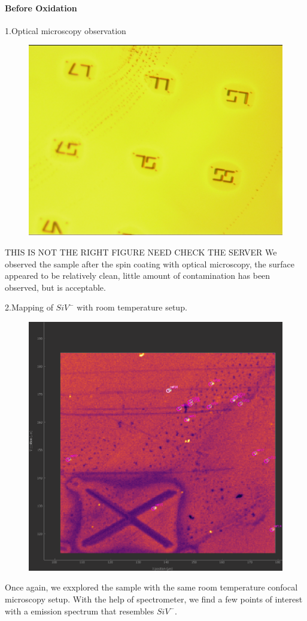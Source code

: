 \paragraph{Before Oxidation}
1.Optical microscopy observation
\FloatBarrier
\begin{figure}[h]
\centering
\includegraphics[width=0.7\linewidth]{Figures/pic/20150907_sample214_spincoated_5}
\caption{}
\label{fig:20150907sample214spincoated5}
\end{figure}
\FloatBarrier  
THIS IS NOT THE RIGHT FIGURE NEED CHECK THE SERVER
We observed the sample after the spin coating with optical microscopy, the surface appeared to be relatively clean, little amount of contamination has been observed, but is acceptable.

2.Mapping of $SiV^{-}$ with room temperature setup.
\FloatBarrier
\begin{figure}[h]
\centering
\includegraphics[width=0.7\linewidth]{Figures/pic/dc}
\caption{}
\label{fig:dc}
\end{figure}
\FloatBarrier
Once again, we exxplored the sample with the same room temperature confocal microscopy setup. With the help of spectrometer, we find a few points of interest with a emission spectrum that resembles $SiV^{-}$. 

